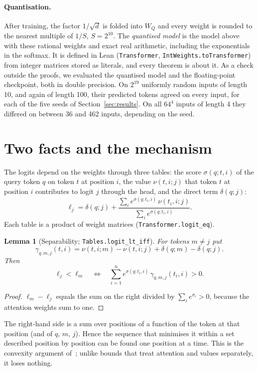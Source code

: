 \documentclass[11pt,a4paper]{article}
\newtheorem{lemma}[theorem]{Lemma}
\newcommand{\lean}[1]{\texttt{#1}}
\begin{document}
\paragraph{Quantisation.}
After training, the factor $1/\sqrt d$ is folded into $W_Q$ and every weight is
rounded to the nearest multiple of $1/S$, $S=2^{10}$. The \emph{quantised
model} is the model above with these rational weights and exact real
arithmetic, including the exponentials in the softmax. It is defined in Lean
(\lean{Transformer}, \lean{IntWeights.toTransformer}) from integer matrices
stored as literals, and every theorem is about it. As a check outside the
proofs, we evaluated the quantised model and the floating-point checkpoint,
both in double precision. On $2^{19}$ uniformly random inputs of length 10, and
again of length 100, their predicted tokens agreed on every input, for each of
the five seeds of Section~\ref{sec:results}. On all $64^4$ inputs of length 4
they differed on between 36 and 462 inputs, depending on the seed.

\section{Two facts and the mechanism}\label{sec:facts}

The logits depend on the weights through three tables: the score
$\sigma(q;t,i)$ of the query token $q$ on token $t$ at position $i$, the value
$\nu(t,i;j)$ that token $t$ at position $i$ contributes to logit $j$ through the
head, and the direct term $\delta(q;j)$:
\[
 \ell_j=\delta(q;j)+\frac{\sum_i e^{\sigma(q;t_i,i)}\,\nu(t_i,i;j)}{\sum_i e^{\sigma(q;t_i,i)}} .
\]
Each table is a product of weight matrices (\lean{Transformer.logit\_eq}).

\begin{lemma}[Separability; \lean{Tables.logit\_lt\_iff}]\label{lem:sep}
For tokens $m\ne j$ put
\[\gamma_{q,m,j}(t,i)=\nu(t,i;m)-\nu(t,i;j)+\delta(q;m)-\delta(q;j).\]
Then
\[
 \ell_j<\ell_m\quad\Longleftrightarrow\quad \sum_{i=1}^n e^{\sigma(q;t_i,i)}\,\gamma_{q,m,j}(t_i,i)>0 .
\]
\end{lemma}
\begin{proof}
$\ell_m-\ell_j$ equals the sum on the right divided by $\sum_ie^{\sigma_i}>0$,
because the attention weights sum to one.
\end{proof}

The right-hand side is a sum over positions of a function of the token at that
position (and of $q$, $m$, $j$). Hence the sequence that minimises it within a
set described position by position can be found one position at a time. This is
the convexity argument of~\cite{gross2024compact}; unlike bounds that treat
attention and values separately, it loses nothing.
\end{document}
